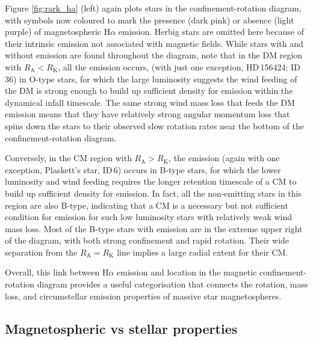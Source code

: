\documentclass[useAMS,usenatbib]{mn2e}
\newcommand{\ra}{R_\mathrm{A}}
\newcommand{\rk}{R_\mathrm{K}}
\begin{document}
Figure \ref{fig:rark_ha} (left) again plots stars in the confinement-rotation diagram, 
with symbols now coloured to mark the presence (dark pink) or absence (light purple) of magnetospheric H$\alpha$ emission. Herbig stars are omitted here because of their intrinsic emission not associated with magnetic fields. 
While stars with and without emission are found throughout the diagram, note that in the DM region with $\ra < \rk$, all the emission occurs, (with just one exception, HD\,156424; ID\,36) in O-type stars, for which the large luminosity suggests the wind feeding of the DM is strong enough to build up sufficient density for emission within the dynamical infall timescale.
The same strong wind mass loss that feeds the DM emission means that they have relatively strong angular momentum loss that spins down the stars to their observed slow rotation rates near the bottom of the confinement-rotation diagram. 

Conversely, in the CM region with $\ra > \rk$, the emission (again with one exception, Plaskett's star, ID\,6) occurs in B-type stars, for which the lower luminosity and wind feeding requires the longer retention timescale of a CM to build up sufficient density for emission.
In fact, all the non-emitting stars in this region are also B-type, indicating that a CM is a necessary but not sufficient condition for emission for such low luminosity stars with relatively weak wind mass loss. Most of the B-type stars with emission are in the extreme upper right of the diagram, with both strong confinement and rapid rotation. Their wide separation from the $\ra=\rk$  line implies a large radial extent for their CM.

Overall, this link between H$\alpha$ emission and location in the magnetic confinement-rotation diagram provides a useful categorisation that connects the rotation, mass loss, and circumstellar emission properties of massive star magnetospheres.



\subsection{Magnetospheric vs stellar properties}
\label{sec:ha_param}
\end{document}
